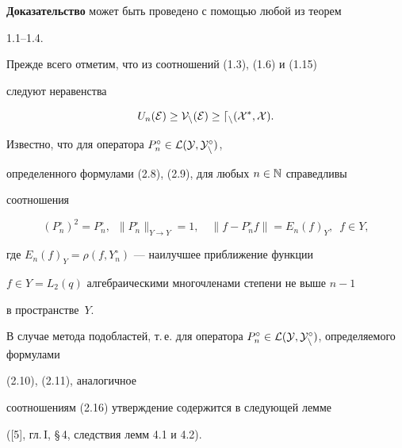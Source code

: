 {\bf Доказательство} может быть проведено с помощью любой из теорем


1.1--1.4.


Прежде всего отметим, что из соотношений (1.3), (1.6) и (1.15)


следуют неравенства


\begin{equation}


U_n(\cal E)\geq V_n(\cal E)\geq d_n(X^*,X).


\end{equation}





Известно, что для оператора $P_n^\circ\in \cal L(Y,Y_n^\circ)$,


определенного формулами (2.8), (2.9), для любых $n\in \Bbb N$ справедливы


соотношения


\begin{equation}


(P_n^\circ)^2=P_n^\circ ,\ \; \|P_n^\circ\|_{Y\rightarrow Y}=1,


\quad \|f-P_n^\circ f\|=E_n(f)_Y,\ \; f\in Y,


\end{equation}


где $E_n(f)_Y =\rho(f,Y_n^\circ )$ --- наилучшее приближение функции


$f\in Y=L_2(q)$ алгебраическими многочленами степени не выше $n-1$


в пространстве~$Y$.





В случае метода подобластей, т.\,е. для оператора $P_n^\circ\in


\cal L(Y,Y_n^\circ)$, определяемого формулами


(2.10), (2.11), аналогичное


соотношениям (2.16) утверждение содержится в следующей лемме


([5], гл.\,I, \S\,4, следствия лемм 4.1 и 4.2).





